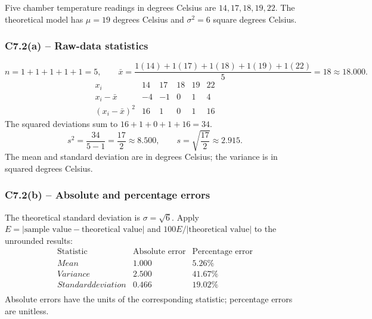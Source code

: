 {
Five chamber temperature readings in degrees Celsius are $14,17,18,19,22$.
The theoretical model has $\mu=19$ degrees Celsius and $\sigma^2=6$ square degrees Celsius.
\label{sol:c7-2a}
\subsubsection*{C7.2(a) -- Raw-data statistics }
\[
n=1+1+1+1+1=5,\qquad
\bar{x}=\frac{1(14)+1(17)+1(18)+1(19)+1(22)}{5}=18\approx18.000.
\]
\[
\begin{array}{c|rrrrr}
x_i&14&17&18&19&22\\\hline
x_i-\bar{x}&-4&-1&0&1&4\\
(x_i-\bar{x})^2&16&1&0&1&16
\end{array}
\]
The squared deviations sum to $16+1+0+1+16=34$.
\[
s^2=\frac{34}{5-1}=\frac{17}{2}\approx8.500,\qquad
s=\sqrt{\frac{17}{2}}\approx2.915.
\]
The mean and standard deviation are in degrees Celsius; the variance is in squared degrees Celsius.

\label{sol:c7-2b}
\subsubsection*{C7.2(b) -- Absolute and percentage errors }
The theoretical standard deviation is $\sigma=\sqrt{6}$.
Apply $E=|\text{sample value}-\text{theoretical value}|$ and
$100E/|\text{theoretical value}|$ to the unrounded results:
\[
\begin{array}{l|rr}
\text{Statistic}&\text{Absolute error}&\text{Percentage error}\\\hline
Mean&1.000&5.26\%\\
Variance&2.500&41.67\%\\
Standard deviation&0.466&19.02\%\\
\end{array}
\]
Absolute errors have the units of the corresponding statistic; percentage errors are unitless.
\secInicio[sec:c7-2]

}

